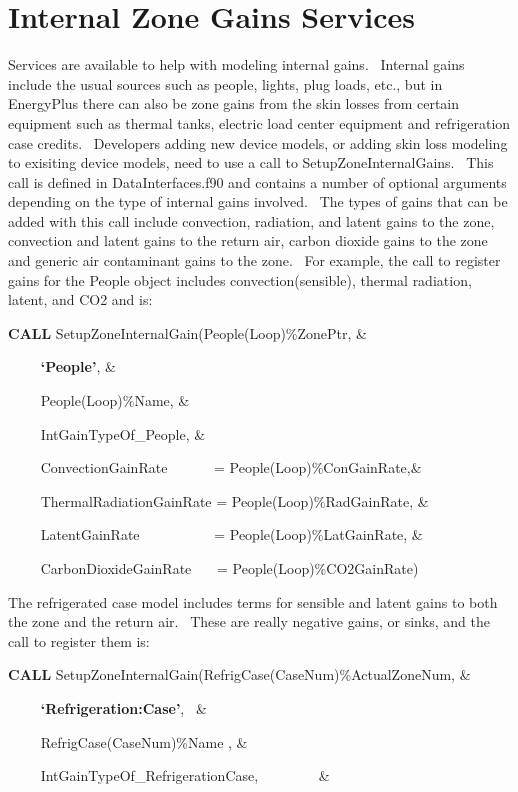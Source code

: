 \section{Internal Zone Gains Services}\label{internal-zone-gains-services}

Services are available to help with modeling internal gains.~ Internal gains include the usual sources such as people, lights, plug loads, etc., but in EnergyPlus there can also be zone gains from the skin losses from certain equipment such as thermal tanks, electric load center equipment and refrigeration case credits.~ Developers adding new device models, or adding skin loss modeling to exisiting device models, need to use a call to SetupZoneInternalGains.~ This call is defined in DataInterfaces.f90 and contains a number of optional arguments depending on the type of internal gains involved.~ The types of gains that can be added with this call include convection, radiation, and latent gains to the zone, convection and latent gains to the return air, carbon dioxide gains to the zone and generic air contaminant gains to the zone.~ For example, the call to register gains for the People object includes convection(sensible), thermal radiation, latent, and CO2 and is:

\textbf{CALL} SetupZoneInternalGain(People(Loop)\%ZonePtr, \&

~~~~ \textbf{`People'}, \&

~~~~ People(Loop)\%Name, \&

~~~~ IntGainTypeOf\_People, \&

~~~~ ConvectionGainRate~~~~~~ = People(Loop)\%ConGainRate,\&

~~~~ ThermalRadiationGainRate = People(Loop)\%RadGainRate, \&

~~~~ LatentGainRate~~~~~~~~~~ = People(Loop)\%LatGainRate, \&

~~~~ CarbonDioxideGainRate~~~ = People(Loop)\%CO2GainRate)

The refrigerated case model includes terms for sensible and latent gains to both the zone and the return air.~ These are really negative gains, or sinks, and the call to register them is:

\textbf{CALL} SetupZoneInternalGain(RefrigCase(CaseNum)\%ActualZoneNum, \&

~~~~ \textbf{`Refrigeration:Case'},~ \&

~~~~ RefrigCase(CaseNum)\%Name , \&

~~~~ IntGainTypeOf\_RefrigerationCase,~~~~~~~~ \&

